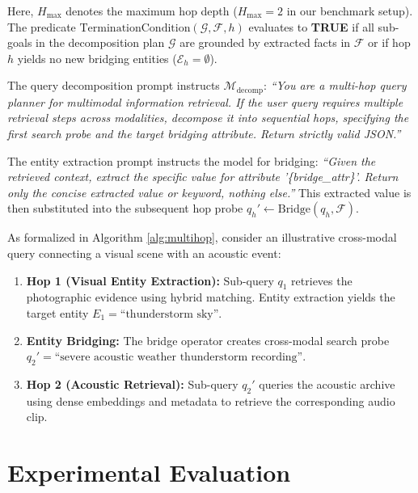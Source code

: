 \documentclass[conference]{IEEEtran}
\begin{document}
Here, $H_{\max}$ denotes the maximum hop depth ($H_{\max} = 2$ in our benchmark setup). The predicate $\text{TerminationCondition}(\mathcal{G}, \mathcal{F}, h)$ evaluates to \textbf{TRUE} if all sub-goals in the decomposition plan $\mathcal{G}$ are grounded by extracted facts in $\mathcal{F}$ or if hop $h$ yields no new bridging entities ($\mathcal{E}_h = \emptyset$). 

The query decomposition prompt instructs $\mathcal{M}_{\text{decomp}}$:
\textit{``You are a multi-hop query planner for multimodal information retrieval. If the user query requires multiple retrieval steps across modalities, decompose it into sequential hops, specifying the first search probe and the target bridging attribute. Return strictly valid JSON.''}

The entity extraction prompt instructs the model for bridging:
\textit{``Given the retrieved context, extract the specific value for attribute '\{bridge\_attr\}'. Return only the concise extracted value or keyword, nothing else.''}
This extracted value is then substituted into the subsequent hop probe $q_h' \leftarrow \text{Bridge}(q_h, \mathcal{F})$.

As formalized in Algorithm \ref{alg:multihop}, consider an illustrative cross-modal query connecting a visual scene with an acoustic event:
\begin{enumerate}
    \item \textbf{Hop 1 (Visual Entity Extraction):} Sub-query $q_1$ retrieves the photographic evidence using hybrid matching. Entity extraction yields the target entity $E_1 = \text{``thunderstorm sky''}$.
    \item \textbf{Entity Bridging:} The bridge operator creates cross-modal search probe $q_2' = \text{``severe acoustic weather thunderstorm recording''}$.
    \item \textbf{Hop 2 (Acoustic Retrieval):} Sub-query $q_2'$ queries the acoustic archive using dense embeddings and metadata to retrieve the corresponding audio clip.
\end{enumerate}

\section{Experimental Evaluation}
\end{document}

